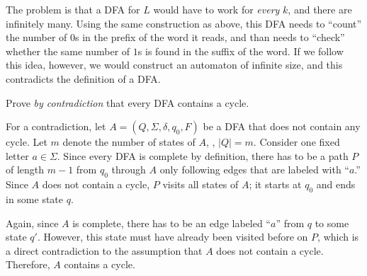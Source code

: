 \documentclass{exercise}
\begin{document}
\begin{solution}
\begin{taskitems}

      \item The problem is that a DFA for $L$ would have to work for \emph{every} $k$, and
        there are infinitely many.  Using the same construction as above, this DFA needs to
        ``count'' the number of $0$s in the prefix of the word it reads, and than needs to
        ``check'' whether the same number of $1$s is found in the suffix of the word.
        If we follow this idea, however, we would construct an automaton of infinite size,
        and this contradicts the definition of a DFA.
    \end{taskitems}
  \end{solution}


Prove \emph{by contradiction} that every DFA contains a cycle.

\begin{solution}
  For a contradiction, let $A=(Q,\Sigma,\delta,q_0,F)$ be a DFA that does not
  contain any cycle.  Let $m$ denote the number of states of $A$, \ie, $|Q|=m$.
  Consider one fixed letter $a\in\Sigma$.  Since every DFA is complete by
  definition, there has to be a path $P$ of length $m-1$ from $q_0$ through $A$
  only following edges that are labeled with ``$a$.\!'' Since $A$ does not
  contain a cycle, $P$ visits all states of $A$; it starts at $q_0$ and
  ends in some state $q$.

  Again, since $A$ is complete, there has to be an edge labeled ``$a$'' from
  $q$ to some state $q'$.  However, this state must have already been visited
  before on $P$, which is a direct contradiction to the assumption that $A$
  does not contain a cycle.  Therefore, $A$ contains a cycle.
\end{solution}

\enlargethispage{6mm}
\end{document}
